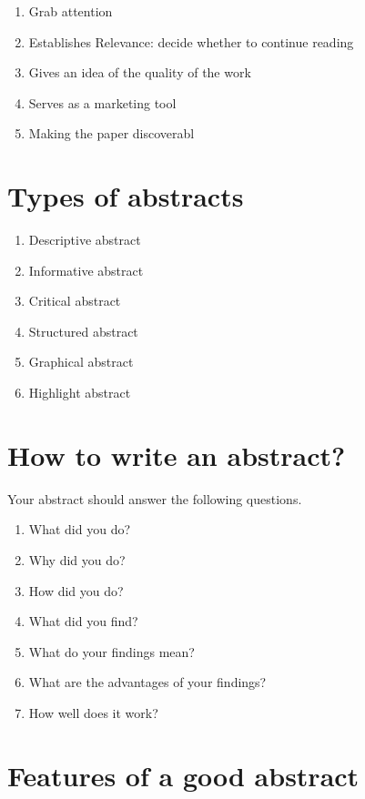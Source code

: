 \documentclass[
  letterpaper,
  DIV=11,
  numbers=noendperiod]{scrreprt}
\begin{document}
\begin{enumerate}
\def\labelenumi{\arabic{enumi}.}
\item
  Grab attention
\item
  Establishes Relevance: decide whether to continue reading
\item
  Gives an idea of the quality of the work
\item
  Serves as a marketing tool
\item
  Making the paper discoverabl
\end{enumerate}

\section{Types of abstracts}\label{types-of-abstracts}

\begin{enumerate}
\def\labelenumi{\arabic{enumi}.}
\item
  Descriptive abstract
\item
  Informative abstract
\item
  Critical abstract
\item
  Structured abstract
\item
  Graphical abstract
\item
  Highlight abstract
\end{enumerate}

\section{How to write an abstract?}\label{how-to-write-an-abstract}

Your abstract should answer the following questions.

\begin{enumerate}
\def\labelenumi{\arabic{enumi}.}
\item
  What did you do?
\item
  Why did you do?
\item
  How did you do?
\item
  What did you find?
\item
  What do your findings mean?
\item
  What are the advantages of your findings?
\item
  How well does it work?
\end{enumerate}

\section{Features of a good abstract}\label{features-of-a-good-abstract}
\end{document}
